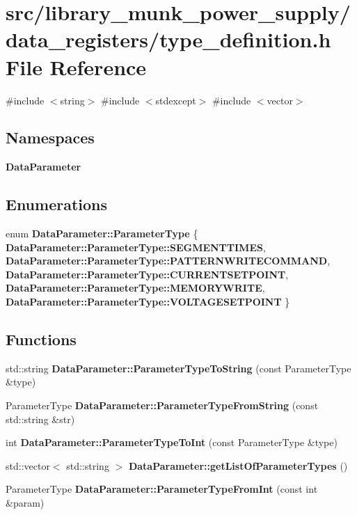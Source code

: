\section{src/library\+\_\+munk\+\_\+power\+\_\+supply/data\+\_\+registers/type\+\_\+definition.h File Reference}
\label{type__definition_8h}
{\ttfamily \#include $<$string$>$}\newline
{\ttfamily \#include $<$stdexcept$>$}\newline
{\ttfamily \#include $<$vector$>$}\newline
\subsection*{Namespaces}
\begin{DoxyCompactItemize}
\item 
 \textbf{ Data\+Parameter}
\end{DoxyCompactItemize}
\subsection*{Enumerations}
\begin{DoxyCompactItemize}
\item 
enum \textbf{ Data\+Parameter\+::\+Parameter\+Type} \{ \newline
\textbf{ Data\+Parameter\+::\+Parameter\+Type\+::\+S\+E\+G\+M\+E\+N\+T\+T\+I\+M\+ES}, 
\textbf{ Data\+Parameter\+::\+Parameter\+Type\+::\+P\+A\+T\+T\+E\+R\+N\+W\+R\+I\+T\+E\+C\+O\+M\+M\+A\+ND}, 
\textbf{ Data\+Parameter\+::\+Parameter\+Type\+::\+C\+U\+R\+R\+E\+N\+T\+S\+E\+T\+P\+O\+I\+NT}, 
\textbf{ Data\+Parameter\+::\+Parameter\+Type\+::\+M\+E\+M\+O\+R\+Y\+W\+R\+I\+TE}, 
\newline
\textbf{ Data\+Parameter\+::\+Parameter\+Type\+::\+V\+O\+L\+T\+A\+G\+E\+S\+E\+T\+P\+O\+I\+NT}
 \}
\end{DoxyCompactItemize}
\subsection*{Functions}
\begin{DoxyCompactItemize}
\item 
std\+::string \textbf{ Data\+Parameter\+::\+Parameter\+Type\+To\+String} (const Parameter\+Type \&type)
\item 
Parameter\+Type \textbf{ Data\+Parameter\+::\+Parameter\+Type\+From\+String} (const std\+::string \&str)
\item 
int \textbf{ Data\+Parameter\+::\+Parameter\+Type\+To\+Int} (const Parameter\+Type \&type)
\item 
std\+::vector$<$ std\+::string $>$ \textbf{ Data\+Parameter\+::get\+List\+Of\+Parameter\+Types} ()
\item 
Parameter\+Type \textbf{ Data\+Parameter\+::\+Parameter\+Type\+From\+Int} (const int \&param)
\end{DoxyCompactItemize}
